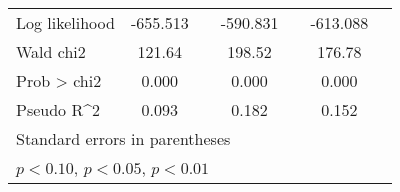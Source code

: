 \begin{table}[htbp]
\begin{tabular}{l*{3}{cc}}
Log likelihood      &    -655.513         &            &    -590.831         &            &    -613.088         &            \\
Wald chi2           &      121.64         &            &      198.52         &            &      176.78         &            \\
Prob > chi2         &       0.000         &            &       0.000         &            &       0.000         &            \\
Pseudo R^2          &       0.093         &            &       0.182         &            &       0.152         &            \\
\hline\hline
\multicolumn{7}{l}{\footnotesize Standard errors in parentheses}\\
\multicolumn{7}{l}{\footnotesize \sym{*} \(p<0.10\), \sym{**} \(p<0.05\), \sym{***} \(p<0.01\)}\\
\end{tabular}
\end{table}
